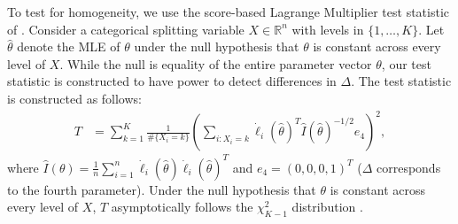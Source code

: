 \documentclass[11pt, sigconf, svgnames]{acmart}
\newcommand{\R}{\mathbb{R}}
\begin{document}
To test for homogeneity, we use the score-based Lagrange Multiplier test
statistic of \cite{merkle2013tests}.  Consider a categorical splitting variable
$X \in \R^n$ with levels in $\{1,\dots,K\}$.  Let $\hat \theta$ denote the MLE of $\theta$ under the null hypothesis that $\theta$ is constant across every level of $X$.  While the null is equality of the entire parameter vector $\theta$, our test statistic is constructed to have power to detect differences in $\Delta$.  The test statistic is constructed as follows:
\begin{align*}
  T &= \sum_{k=1}^K \frac{1}{\#\{X_i = k\}} \left(\sum_{i: X_i=k}
  \dot\ell_i(\hat\theta)^T\hat{I}(\hat\theta)^{-1/2}e_4\right)^2 ,
\end{align*}
where $\hat{I}(\theta) = \frac{1}{n}\sum_{i=1}^n
\dot\ell_i(\hat\theta)\dot\ell_i(\hat\theta)^T$ and $e_4 = (0,0,0,1)^T$ ($\Delta$
corresponds to the fourth parameter).  Under the null hypothesis that $\theta$ is constant across every level of $X$, $T$ asymptotically follows the $\chi_{K-1}^2$
distribution \cite{hjort2002tests}.
\end{document}
